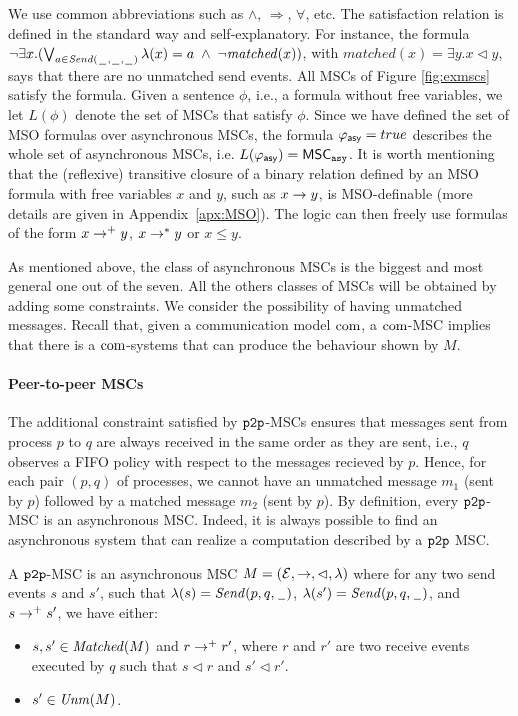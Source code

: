 We use common abbreviations such as $\wedge$, $\Rightarrow$, $\forall$, etc. The satisfaction relation is defined in the standard way and self-explanatory.
For instance, the formula $\neg\exists x.(\bigvee_{a \in {\mathit{Send}(\hspace{0.1em}\underline{\hspace{0.5em}}\hspace{0.1em},\hspace{0.1em}\underline{\hspace{0.5em}}\hspace{0.1em},\hspace{0.1em}\underline{\hspace{0.5em}}\hspace{0.1em})}} \lambda(x) = a \;\wedge\; \neg \mathit{matched}(x))$, 
with $\mathit{matched}(x) = \exists y.x \lhd y$, 
says that there are no unmatched send events. All MSCs of Figure \ref{fig:exmscs} satisfy the formula. Given a sentence $\phi$, i.e., a formula without free variables,
we let $L(\phi)$ denote the set of MSCs that satisfy $\phi$. Since we have defined the set of MSO formulas over asynchronous MSCs, the formula $\varphi_{\mathsf{asy}} = true$ describes the whole set of asynchronous MSCs, i.e. $L(\varphi_{\mathsf{asy}}) = \mathsf{MSC}_{\mathtt{asy}}$. It is worth mentioning that the (reflexive) transitive closure of a binary relation defined by an MSO formula with free variables $x$ and $y$, such as $x \to y$, is MSO-definable (more details are given in Appendix~\ref{apx:MSO}). The logic can then freely use formulas of the form $x \to^+ y$, $x \to^* y$ or $x \le y$.

As mentioned above, the class of asynchronous MSCs is the biggest and most general one out of the seven. All the others classes of MSCs will be obtained by adding some constraints. We consider the possibility of having unmatched messages. Recall that, given a communication model $\textup{com}$, a $\textup{com}$-MSC implies that there is a $\textup{com}$-systems that can produce the behaviour shown by $M$.


\paragraph{\bf Peer-to-peer MSCs}
The additional constraint satisfied by $\mathtt{p2p}$-MSCs ensures that messages sent from  process $p$ to  $q$ are always received in the same order as they are sent, i.e., $q$ observes a FIFO policy with respect to the messages recieved by $p$.  Hence, for each pair $(p,q)$ of processes, we cannot have an unmatched message $m_1$ (sent by $p$) followed by a matched message $m_2$ (sent by $p$).  By definition, every $\mathtt{p2p}$-MSC is an asynchronous MSC. Indeed, it is always possible to find an asynchronous system that can realize a computation described by a $\mathtt{p2p}$ MSC. 
\begin{definition}\label{def:pp_msc}
A $\mathtt{p2p}$-MSC is an asynchronous MSC $M = (\mathcal{E},\to,\lhd,\lambda)$ where for any two send events $s$ and $s'$, such that $\lambda(s)={\mathit{Send}(p,q,\hspace{0.1em}\underline{\hspace{0.5em}}\hspace{0.1em})}$, $\lambda(s')={\mathit{Send}(p,q,\hspace{0.1em}\underline{\hspace{0.5em}}\hspace{0.1em})}$, and $s \to^+ s'$, we have either:
\begin{itemize}\itemsep=0.5ex
	\item $s,s' \in \mathit{Matched}(M)$ and $r \to^+ r'$, where $r$ and $r'$ are two receive events executed by $q$ such that $s \lhd r$ and $s' \lhd r'$.
	\item $s' \in \mathit{Unm}(M)$.
\end{itemize}

\end{definition}


